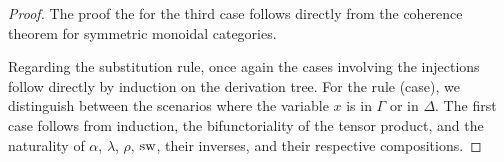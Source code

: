 \documentclass[10pt,a4paper]{amsart}
\theoremstyle{definition}
\theoremstyle{definition}
\theoremstyle{definition}
\theoremstyle{definition}
\theoremstyle{definition}
\theoremstyle{definition}
\begin{document}
\begin{proof}
%

The proof the for the third case follows directly from the coherence theorem
for symmetric monoidal categories.

Regarding the substitution rule, once again the cases involving the injections follow directly by induction on the derivation tree. For the rule (case), we distinguish between the scenarios where the variable $x$ is in $\Gamma$ or in $\Delta$. The first case follows from induction, the bifunctoriality of the tensor product, and the naturality of $\alpha$, $\lambda$, $\rho$, $\mathrm{sw}$, their inverses, and their respective compositions.


\end{proof}
\end{document}
